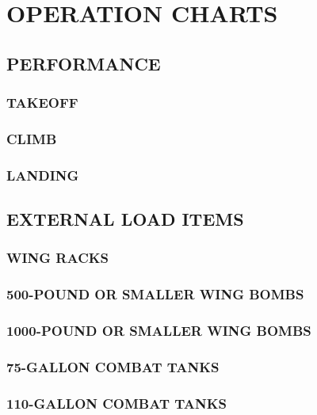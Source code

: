 \chapter{OPERATION CHARTS}
\minitoc
\cleardoublepage


\section{PERFORMANCE}
\subsection{TAKEOFF}
\subsection{CLIMB}
\subsection{LANDING}


\section{EXTERNAL LOAD ITEMS}
\subsection{WING RACKS}
\subsection{500-POUND OR SMALLER WING BOMBS}
\subsection{1000-POUND OR SMALLER WING BOMBS}
\subsection{75-GALLON COMBAT TANKS}
\subsection{110-GALLON COMBAT TANKS}


\cleardoublepage